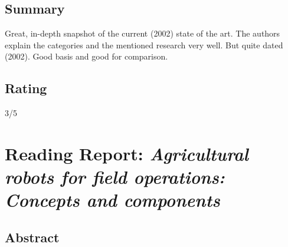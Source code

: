     \subsection*{Summary}
    Great, in-depth snapshot of the current (2002) state of the art. The authors explain the categories and the mentioned research very well.
    But quite dated (2002). Good basis and good for comparison.
    
    \subsection*{Rating}
    3/5
    
    \newpage
    \section{Reading Report: \emph{Agricultural robots for field operations: Concepts and components}}
    \cite{Bechar2016}
    
    \subsection*{Abstract}
    
